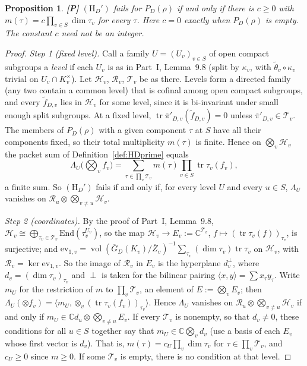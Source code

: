 \documentclass[12pt]{article}
\newcommand{\ov}[1]{\overline{#1}}
\newcommand{\C}{\mathbb{C}}
\newcommand{\tr}{\operatorname{tr}}
\newcommand{\vol}{\operatorname{vol}}
\newcommand{\Zb}{\ov{Z}}
\newcommand{\GDb}{\ov{G}_D}
\newcommand{\pib}{\ov{\pi}}
\newcommand{\Pv}{\textbf{[P]}}
\theoremstyle{plain}
\newtheorem{proposition}[theorem]{Proposition}
\theoremstyle{definition}
\begin{document}
\begin{proposition}\label{prop:cancel2}\Pv
$(\mathrm H_D')$ fails for $P_D(\rho)$ if and only if there is $c\ge0$ with $m(\tau)=c\prod_{v\in S}\dim\tau_v$ for every $\tau$. Here $c=0$ exactly when $P_D(\rho)$ is empty. The constant $c$ need not be an integer.
\end{proposition}
\begin{proof}
\emph{Step 1 (fixed level).} Call a family $U=(U_v)_{v\in S}$ of open compact subgroups a \emph{level} if each $U_v$ is as in Part~I, Lemma~9.8 (split by $\kappa_v$, with $\tilde\theta_v\circ\kappa_v$ trivial on $U_v\cap K_v^\times$). Let $\mathcal H_v$, $\mathcal R_v$, $\mathcal T_v$ be as there. Levels form a directed family (any two contain a common level) that is cofinal among open compact subgroups, and every $\tilde f_{D,v}$ lies in $\mathcal H_v$ for some level, since it is bi-invariant under small enough split subgroups. At a fixed level, $\tr\pib'_{D,v}(\tilde f_{D,v})=0$ unless $\pib'_{D,v}\in\mathcal T_v$. The members of $P_D(\rho)$ with a given component $\tau$ at $S$ have all their components fixed, so their total multiplicity $m(\tau)$ is finite. Hence on $\bigotimes_v\mathcal H_v$ the packet sum of Definition~\ref{def:HDprime} equals
\[ \Lambda_U\big(\textstyle\bigotimes_v f_v\big)=\sum_{\tau\in\prod_v\mathcal T_v}m(\tau)\prod_{v\in S}\tr\tau_v(f_v), \]
a finite sum. So $(\mathrm H_D')$ fails if and only if, for every level $U$ and every $u\in S$, $\Lambda_U$ vanishes on $\mathcal R_u\otimes\bigotimes_{v\ne u}\mathcal H_v$.

\emph{Step 2 (coordinates).} By the proof of Part~I, Lemma~9.8, $\mathcal H_v\cong\bigoplus_{\tau_v\in\mathcal T_v}\mathrm{End}(\tau_v^{U_v})$, so the map $\mathcal H_v\to E_v:=\C^{\mathcal T_v}$, $f\mapsto(\tr\tau_v(f))_{\tau_v}$, is surjective; and $\mathrm{ev}_{1,v}=\vol(\GDb(K_v)/\Zb_v)^{-1}\sum_{\tau_v}(\dim\tau_v)\tr\tau_v$ on $\mathcal H_v$, with $\mathcal R_v=\ker\mathrm{ev}_{1,v}$. So the image of $\mathcal R_v$ in $E_v$ is the hyperplane $d_v^\perp$, where $d_v=(\dim\tau_v)_{\tau_v}$ and $\perp$ is taken for the bilinear pairing $\langle x,y\rangle=\sum x_\tau y_\tau$. Write $m_U$ for the restriction of $m$ to $\prod_v\mathcal T_v$, an element of $E:=\bigotimes_vE_v$; then $\Lambda_U(\otimes f_v)=\langle m_U,\otimes_v(\tr\tau_v(f_v))_{\tau_v}\rangle$. Hence $\Lambda_U$ vanishes on $\mathcal R_u\otimes\bigotimes_{v\ne u}\mathcal H_v$ if and only if $m_U\in\C d_u\otimes\bigotimes_{v\ne u}E_v$. If every $\mathcal T_v$ is nonempty, so that $d_v\ne0$, these conditions for all $u\in S$ together say that $m_U\in\C\bigotimes_vd_v$ (use a basis of each $E_v$ whose first vector is $d_v$). That is, $m(\tau)=c_U\prod_v\dim\tau_v$ for $\tau\in\prod_v\mathcal T_v$, and $c_U\ge0$ since $m\ge0$. If some $\mathcal T_v$ is empty, there is no condition at that level.


\end{proof}
\end{document}

